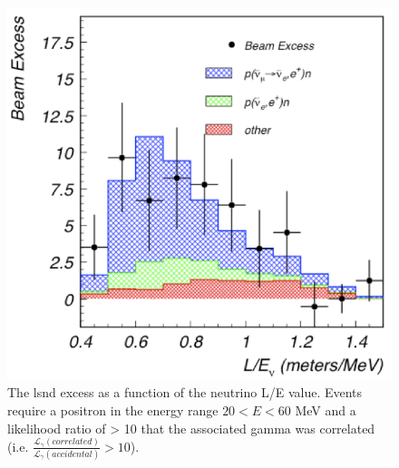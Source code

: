 \begin{figure}[h]
    \centering
    \includegraphics[width = \largefigwidth]{figures-chap2/LSND_excess.png}
    \caption[LSND excsess.]{The \gls{lsnd} excess as a function of the neutrino L/E value. Events require a positron in the energy range $20 < E < 60$ MeV and a likelihood ratio of > 10 that the associated gamma was correlated (i.e. $\frac{\mathcal{L}_{\gamma}(correlated)}{\mathcal{L}_{\gamma}(accidental)} > 10$). \cite{LSND_excess}}
    \label{fig:LSND excess}
\end{figure}
\newpage

